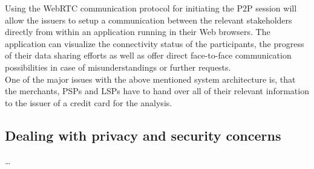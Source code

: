 Using the \gls{WebRTC} communication protocol for initiating the \gls{P2P} session will allow the issuers to setup a communication between the relevant stakeholders directly from within an application running in their Web browsers. The application can visualize the connectivity status of the participants, the progress of their data sharing efforts as well as offer direct face-to-face communication possibilities in case of misunderstandings or further requests. \\

One of the major issues with the above mentioned system architecture is, that the merchants, \gls{PSP}s and \gls{LSP}s have to hand over all of their relevant information to the issuer of a credit card for the analysis. \\

\subsection{Dealing with privacy and security concerns}
\label{subsec:p2p_partially_issuer_privacy}

\ldots



